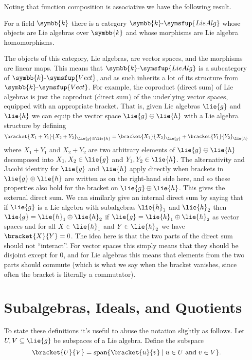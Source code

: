 \documentclass[fleqn]{NotesClass}
\makeatletter
\renewcommand{\field}{\symbb{k}}
\newcommand{\c@egory}[1]{\symsfup{#1}}
\newcommand{\Vect}[1][\field]{#1\text{-}\c@egory{Vect}}
\newcommand{\LieAlg}[1][\field]{#1\text{-}\c@egory{LieAlg}}
\DeclareMathOperator{\Span}{span}
\makeatother
\begin{document}
    Noting that function composition is associative we have the following result.
    
    \begin{crl}{}{}
        For a field \(\field\) there is a category \(\LieAlg\) whose objects are Lie algebras over \(\field\) and whose morphisms are Lie algebra homomorphisms.
    \end{crl}
    
    The objects of this category, Lie algebras, are vector spaces, and the morphisms are linear maps.
    This means that \(\LieAlg\) is a subcategory of \(\Vect\), and as such inherits a lot of its structure from \(\Vect\).
    For example, the coproduct (direct sum) of Lie algebras is just the coproduct (direct sum) of the underlying vector spaces, equipped with an appropriate bracket.
    That is, given Lie algebras \(\lie{g}\) and \(\lie{h}\) we can equip the vector space \(\lie{g} \oplus \lie{h}\) with a Lie algebra structure by defining
    \begin{equation}
        \bracket{X_1 + Y_1}{X_2 + Y_2}_{\lie{g} \oplus \lie{h}} = \bracket{X_1}{X_2}_{\lie{g}} + \bracket{Y_1}{Y_2}_{\lie{h}}
    \end{equation} 
    where \(X_1 + Y_1\) and \(X_2 + Y_2\) are two arbitrary elements of \(\lie{g} \oplus \lie{h}\) decomposed into \(X_1, X_2 \in \lie{g}\) and \(Y_1, Y_2 \in \lie{h}\).
    The alternativity and Jacobi identity for \(\lie{g}\) and \(\lie{h}\) apply directly when brackets in \(\lie{g} \oplus \lie{h}\) are written as on the right-hand side here, and so these properties also hold for the bracket on \(\lie{g} \oplus \lie{h}\).
    This gives the external direct sum.
    We can similarly give an internal direct sum by saying that if \(\lie{g}\) is a Lie algebra with subalgebras \(\lie{h}_1\) and \(\lie{h}_2\) then \(\lie{g} = \lie{h}_1 \oplus \lie{h}_2\) if \(\lie{g} = \lie{h}_1 \oplus \lie{h}_2\) as vector spaces and for all \(X \in \lie{h}_1\) and \(Y \in \lie{h}_2\) we have \(\bracket{X}{Y} = 0\).
    The idea here is that the two parts of the direct sum should not \enquote{interact}.
    For vector spaces this simply means that they should be disjoint except for 0, and for Lie algebras this means that elements from the two parts should commute (which is what we say when the bracket vanishes, since often the bracket is literally a commutator).
        
    \section{Subalgebras, Ideals, and Quotients}
    To state these definitions it's useful to abuse the notation slightly as follows.
    Let \(U, V \subseteq \lie{g}\) be subspaces of a Lie algebra.
    Define the subspace
    \begin{equation}
        \bracket{U}{V} = \Span\{\bracket{u}{v} \mid u \in U \text{ and } v \in V\}.
    \end{equation}
    
\end{document}
